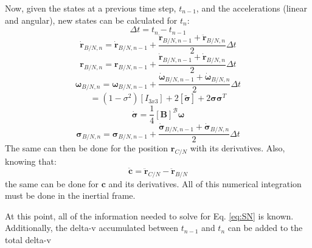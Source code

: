Now, given the states at a previous time step, $t_{n-1}$, and the accelerations (linear and angular), new states can be calculated for $t_n$:
\begin{equation}
	\Delta t = t_{n} - t_{n-1}
\end{equation}
\begin{equation}
\dot{\bm{r}}_{B/N,n} = \dot{\bm{r}}_{B/N,n-1} + \frac{\ddot{\bm{r}}_{B/N,n-1}+\ddot{\bm{r}}_{B/N,n}}{2} \Delta t
\end{equation}
\begin{equation}
	\bm{r}_{B/N,n} = \bm{r}_{B/N,n-1} + \frac{\dot{\bm{r}}_{B/N,n-1}+\dot{\bm{r}}_{B/N,n}}{2} \Delta t
\end{equation}
\begin{equation}
\bm{\omega}_{B/N,n} = \bm{\omega}_{B/N,n-1} + \frac{\dot{\bm{\omega}}_{B/N,n-1}+\dot{\bm{\omega}}_{B/N,n}}{2} \Delta t
\end{equation}
\begin{equation}
[\bm{B}] = (1-\sigma^2)[I_{3x3}]+2[\tilde{\bm{\sigma}}] + 2\bm{\sigma}\bm{\sigma}^T
\end{equation}
\begin{equation}
	\bm{\dot{\sigma}} = \frac{1}{4} [\bm{B}] ^\mathcal{B}\bm{\omega}
\end{equation}
\begin{equation}
\bm{\sigma}_{B/N,n} = \bm{\sigma}_{B/N,n-1} + \frac{\dot{\bm{\sigma}}_{B/N,n-1}+\dot{\bm{\sigma}}_{B/N,n}}{2} \Delta t
\end{equation}
The same can then be done for the position $ {\bm{r}}_{C/N}$ with its derivatives. Also, knowing that:
\begin{equation}
\ddot{\bm{c}} = \ddot{\bm{r}}_{C/N} - \ddot{\bm{r}}_{B/N}
\end{equation}
the same can be done for $\bm{c}$ and its derivatives. All of this numerical integration must be done in the inertial frame.

At this point, all of the information needed to solve for Eq. \ref{eq:SN} is known. Additionally, the delta-v accumulated between $t_{n-1}$ and $t_{n}$ can be added to the total delta-v

